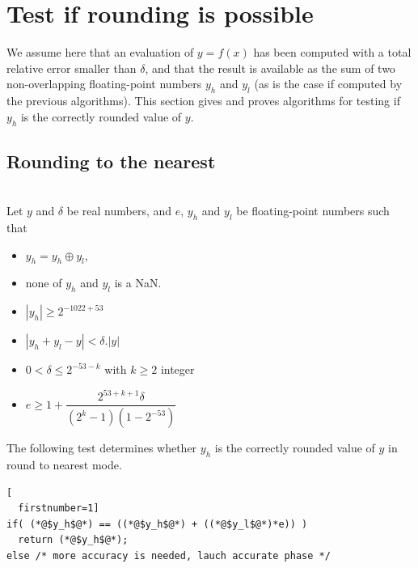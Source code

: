 \section{Test if rounding is possible\label{section:testrounding}}

We assume here that an evaluation of $y=f(x)$ has been computed with a
total relative error smaller than $\delta$, and that the result is
available as the sum of two non-overlapping floating-point numbers
$y_h$ and $y_l$ (as is the case if computed by the previous
algorithms). This section gives and proves algorithms for testing if
$y_h$ is the correctly rounded value of $y$.




\subsection{Rounding to the nearest}

\begin{theorem}
\label{th:roundingRN1}
~\\
      Let $y$ and $\delta$ be real numbers, and $e$, $y_h$ and $y_l$ be
  floating-point numbers such that 
  \begin{itemize}
  \item $y_h=y_h\oplus y_l$,
  \item none of $y_h$ and $y_l$ is a  NaN.
  \item $|y_h|\ge 2^{-1022+53}$ 
  \item $|y_h+y_l - y| < \delta.|y|$
  \item $0< \delta \le 2^{-53-k}$ with $k\ge 2$ integer
  \item $e\ge 1+  \dfrac{2^{53+k+1}\delta}{(2^{k}-1)(1-2^{-53})}$
\end{itemize}

The following test determines whether $y_h$ is the
  correctly rounded value of $y$ in  round to nearest mode.

\begin{lstlisting}[
  firstnumber=1]
if( (*@$y_h$@*) == ((*@$y_h$@*) + ((*@$y_l$@*)*e)) )
  return (*@$y_h$@*);
else /* more accuracy is needed, lauch accurate phase */
\end{lstlisting}
\end{theorem}

